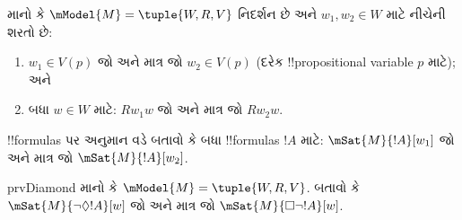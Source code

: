 \documentclass[../../../include/open-logic-section]{subfiles}
\begin{document}
\begin{prob}
  માનો કે $\mModel{M} = \tuple{W, R, V}$ નિદર્શન છે
  અને $w_1, w_2 \in W$ માટે નીચેની શરતો છે:
  \begin{enumerate}
  \item $w_1 \in V(p)$ જો અને માત્ર જો $w_2 \in V(p)$
    (દરેક !!{propositional variable} $p$ માટે); અને
  \item બધા $w \in W$ માટે: $Rw_1w$ જો અને માત્ર જો $Rw_2w$.
  \end{enumerate}
  !!{formula}s પર અનુમાન વડે બતાવો કે બધા !!{formula}s $!A$ માટે:
  $\mSat{M}{!A}[w_1]$ જો અને માત્ર જો $\mSat{M}{!A}[w_2]$.
\end{prob}

\begin{probtag}{prvDiamond}
  માનો કે $\mModel{M} = \tuple{W, R, V}$. બતાવો કે
  $\mSat{M}{\lnot\Diamond !A}[w]$ જો અને માત્ર જો
  $\mSat{M}{\Box\lnot!A}[w]$.
\end{probtag}
\end{document}
